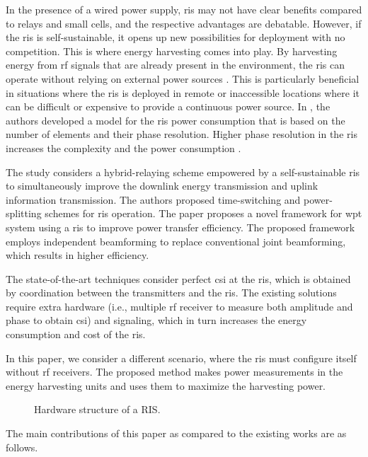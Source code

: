 \documentclass[conference]{IEEEtran}
\begin{document}
In the presence of a wired power supply, \gls*{ris} may not have clear benefits compared to relays and small cells, and the respective advantages are debatable. However, if the \gls*{ris} is self-sustainable, it opens up new possibilities for deployment with no competition. This is where energy harvesting comes into play. By harvesting energy from \gls*{rf} signals that are already present in the environment, the \gls*{ris} can operate without relying on external power sources \cite{ntontin2022wireless}. This is particularly beneficial in situations where the \gls*{ris} is deployed in remote or inaccessible locations where it can be difficult or expensive to provide a continuous power source. In \cite{8741198}, the authors developed a model for the \gls*{ris} power consumption that is based on the number of elements and their phase resolution. Higher phase resolution in the \gls*{ris} increases the complexity and the power consumption \cite{7370753}. 


The study \cite{9214497} considers a hybrid-relaying scheme empowered by a self-sustainable \gls*{ris} to simultaneously improve the downlink energy transmission and uplink information transmission. The authors proposed time-switching and power-splitting schemes for \gls*{ris} operation. The paper \cite{9895266} proposes a novel framework for \gls*{wpt} system using a \gls*{ris} to improve power transfer efficiency. The proposed framework employs independent beamforming to replace conventional joint beamforming, which results in higher efficiency. 


The state-of-the-art techniques consider perfect \gls*{csi} at the \gls*{ris}, which is obtained by coordination between the transmitters and the \gls*{ris}. The existing solutions require extra hardware (i.e., multiple \gls*{rf} receiver to measure both amplitude and phase to obtain \gls*{csi}) and signaling, which in turn increases the energy consumption and cost of the \gls*{ris}. 

In this paper, we consider a different scenario, where the \gls*{ris} must configure itself without \gls*{rf} receivers. The proposed method makes power measurements in the energy harvesting units and uses them to maximize the harvesting power. 
\begin{figure}[t]
    \centering
    \hspace{-15mm}
    \scalebox{0.65}{}
    \vspace{-10mm}
    \caption{\small Hardware structure of a RIS.}
    \label{fig:RIS_structure}
\end{figure}
The main contributions of this paper as compared to the existing works are as follows.
\end{document}
